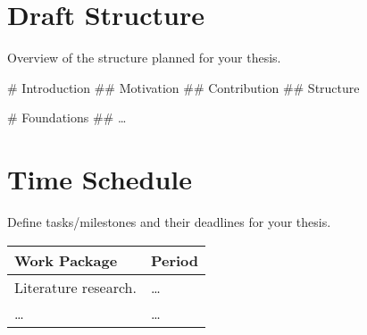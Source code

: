 \documentclass{scrartcl}
\begin{document}
\section{Draft Structure}\label{sec:draft}
Overview of the structure planned for your thesis.

\begin{easylist}[articletoc]
    # Introduction
    ## Motivation
    ## Contribution
    ## Structure

    # Foundations
    ## \dots
\end{easylist}


\section{Time Schedule}\label{sec:schedule}
Define tasks/milestones and their deadlines for your thesis.

\begin{longtable}{ll}
    \toprule

    \textbf{Work Package} & \textbf{Period} \\%
    \midrule%
    \endhead%

    Literature research.  & \dots           \\
    \dots                 & \dots           \\

    \bottomrule
\end{longtable}



\printbibliography
\end{document}

